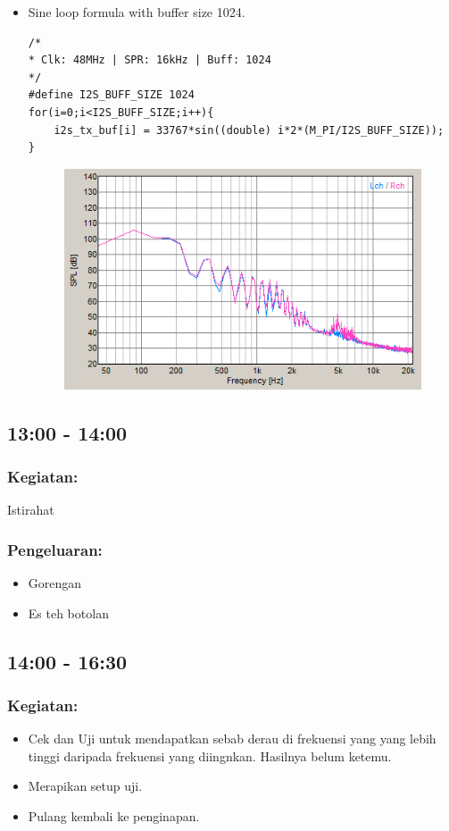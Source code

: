 \documentclass[12pt,]{article}
\begin{document}
\begin{itemize}
\begin{itemize}
			\newpage
			\item Sine loop formula with buffer size 1024.
			\begin{verbatim}
/*
* Clk: 48MHz | SPR: 16kHz | Buff: 1024
*/
#define I2S_BUFF_SIZE 1024	
for(i=0;i<I2S_BUFF_SIZE;i++){
	i2s_tx_buf[i] = 33767*sin((double) i*2*(M_PI/I2S_BUFF_SIZE));
}
			\end{verbatim}
			\begin{figure}[H]
				\centering
				\includegraphics[width=0.5\linewidth]{result/max1024}
			\end{figure}
			
		\end{itemize}
	\end{itemize}
	
	\subsection{13:00 - 14:00}
	\subsubsection{Kegiatan:}
	Istirahat
	
	\subsubsection{Pengeluaran:}
	\begin{itemize}
		\item Gorengan
		\item Es teh botolan
	\end{itemize}

	\subsection{14:00 - 16:30}
	\subsubsection{Kegiatan:}
	\begin{itemize}
		\item Cek dan Uji untuk mendapatkan sebab derau di frekuensi yang yang lebih tinggi daripada frekuensi yang diingnkan.
		Hasilnya belum ketemu.
		\item Merapikan setup uji.
		\item Pulang kembali ke penginapan.
	\end{itemize}
	
\end{document}
